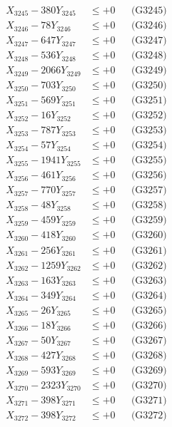 \documentclass[a4paper,10pt]{article}
\begin{document}
{\begin{align}
X_{3245} - 380Y_{3245} &\leq +0 && \text{(G3245)} \\
X_{3246} - 78Y_{3246} &\leq +0 && \text{(G3246)} \\
X_{3247} - 647Y_{3247} &\leq +0 && \text{(G3247)} \\
X_{3248} - 536Y_{3248} &\leq +0 && \text{(G3248)} \\
X_{3249} - 2066Y_{3249} &\leq +0 && \text{(G3249)} \\
X_{3250} - 703Y_{3250} &\leq +0 && \text{(G3250)} \\
\allowbreak
X_{3251} - 569Y_{3251} &\leq +0 && \text{(G3251)} \\
X_{3252} - 16Y_{3252} &\leq +0 && \text{(G3252)} \\
X_{3253} - 787Y_{3253} &\leq +0 && \text{(G3253)} \\
X_{3254} - 57Y_{3254} &\leq +0 && \text{(G3254)} \\
X_{3255} - 1941Y_{3255} &\leq +0 && \text{(G3255)} \\
X_{3256} - 461Y_{3256} &\leq +0 && \text{(G3256)} \\
X_{3257} - 770Y_{3257} &\leq +0 && \text{(G3257)} \\
X_{3258} - 48Y_{3258} &\leq +0 && \text{(G3258)} \\
X_{3259} - 459Y_{3259} &\leq +0 && \text{(G3259)} \\
X_{3260} - 418Y_{3260} &\leq +0 && \text{(G3260)} \\
\allowbreak
X_{3261} - 256Y_{3261} &\leq +0 && \text{(G3261)} \\
X_{3262} - 1259Y_{3262} &\leq +0 && \text{(G3262)} \\
X_{3263} - 163Y_{3263} &\leq +0 && \text{(G3263)} \\
X_{3264} - 349Y_{3264} &\leq +0 && \text{(G3264)} \\
X_{3265} - 26Y_{3265} &\leq +0 && \text{(G3265)} \\
X_{3266} - 18Y_{3266} &\leq +0 && \text{(G3266)} \\
X_{3267} - 50Y_{3267} &\leq +0 && \text{(G3267)} \\
X_{3268} - 427Y_{3268} &\leq +0 && \text{(G3268)} \\
X_{3269} - 593Y_{3269} &\leq +0 && \text{(G3269)} \\
X_{3270} - 2323Y_{3270} &\leq +0 && \text{(G3270)} \\
\allowbreak
X_{3271} - 398Y_{3271} &\leq +0 && \text{(G3271)} \\
X_{3272} - 398Y_{3272} &\leq +0 && \text{(G3272)} \\

\end{align}}
\end{document}
